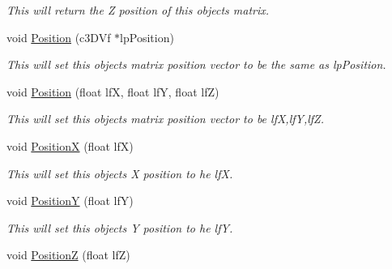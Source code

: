 \begin{DoxyCompactItemize}
\begin{DoxyCompactList}\small\item\em This will return the Z position of this objects matrix. \end{DoxyCompactList}\item 
\hypertarget{classc_camera_matrix4_a7110b0f3aa924a2cfefe8ca149e0b41f}{
void \hyperlink{classc_camera_matrix4_a7110b0f3aa924a2cfefe8ca149e0b41f}{Position} (c3DVf $\ast$lpPosition)}
\label{classc_camera_matrix4_a7110b0f3aa924a2cfefe8ca149e0b41f}

\begin{DoxyCompactList}\small\item\em This will set this objects matrix position vector to be the same as lpPosition. \end{DoxyCompactList}\item 
\hypertarget{classc_camera_matrix4_a1aa471464a30ce27fe339b743b840516}{
void \hyperlink{classc_camera_matrix4_a1aa471464a30ce27fe339b743b840516}{Position} (float lfX, float lfY, float lfZ)}
\label{classc_camera_matrix4_a1aa471464a30ce27fe339b743b840516}

\begin{DoxyCompactList}\small\item\em This will set this objects matrix position vector to be lfX,lfY,lfZ. \end{DoxyCompactList}\item 
\hypertarget{classc_camera_matrix4_af130ddef040458f01b9a2365f41c567a}{
void \hyperlink{classc_camera_matrix4_af130ddef040458f01b9a2365f41c567a}{PositionX} (float lfX)}
\label{classc_camera_matrix4_af130ddef040458f01b9a2365f41c567a}

\begin{DoxyCompactList}\small\item\em This will set this objects X position to he lfX. \end{DoxyCompactList}\item 
\hypertarget{classc_camera_matrix4_adce3f6365faf3af907994f50c004c736}{
void \hyperlink{classc_camera_matrix4_adce3f6365faf3af907994f50c004c736}{PositionY} (float lfY)}
\label{classc_camera_matrix4_adce3f6365faf3af907994f50c004c736}

\begin{DoxyCompactList}\small\item\em This will set this objects Y position to he lfY. \end{DoxyCompactList}\item 
\hypertarget{classc_camera_matrix4_a6ea814a92ce2d7fcc1ba66490127b2f2}{
void \hyperlink{classc_camera_matrix4_a6ea814a92ce2d7fcc1ba66490127b2f2}{PositionZ} (float lfZ)}
\label{classc_camera_matrix4_a6ea814a92ce2d7fcc1ba66490127b2f2}


\end{DoxyCompactItemize}
